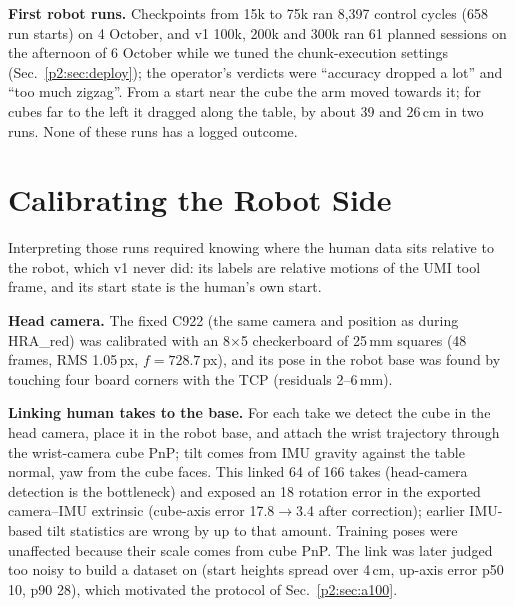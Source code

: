 \documentclass[conference,10pt]{IEEEtran}
\newcommand{\mm}{\,mm\xspace}
\begin{document}
\begin{table}[t]
\centering\footnotesize\setlength{\tabcolsep}{3pt}
\caption{Held-out loss (masked MSE on the 9 supervised dimensions) by checkpoint; training-subset loss in parentheses.}
\label{p2:tab:val}
\end{table}

\textbf{First robot runs.} Checkpoints from 15k to 75k ran 8{,}397 control cycles (658 run starts) on 4 October, and v1 100k,
200k and 300k ran 61 planned sessions on the afternoon of 6 October while we tuned the chunk-execution settings
(Sec.~\ref{p2:sec:deploy}); the operator's verdicts were ``accuracy dropped a lot'' and ``too much zigzag''. From a start near
the cube the arm moved towards it; for cubes far to the left it dragged along the table, by about 39 and 26\,cm in two runs.
None of these runs has a logged outcome.

\section{Calibrating the Robot Side}\label{p2:sec:robotcal}
Interpreting those runs required knowing where the human data sits relative to the robot, which v1 never did: its labels are
relative motions of the UMI tool frame, and its start state is the human's own start.

\textbf{Head camera.} The fixed C922 (the same camera and position as during HRA\_red) was calibrated with an 8$\times$5
checkerboard of 25\mm squares (48 frames, RMS 1.05\,px, $f=728.7$\,px), and its pose in the robot base was found by touching
four board corners with the TCP (residuals 2--6\mm).

\textbf{Linking human takes to the base.} For each take we detect the cube in the head camera, place it in the robot base, and
attach the wrist trajectory through the wrist-camera cube PnP; tilt comes from IMU gravity against the table normal, yaw from
the cube faces. This linked 64 of 166 takes (head-camera detection is the bottleneck) and exposed an 18\textdegree{} rotation
error in the exported camera--IMU extrinsic (cube-axis error 17.8$\to$3.4\textdegree{} after correction); earlier IMU-based
tilt statistics are wrong by up to that amount. Training poses were unaffected because their scale comes from cube PnP. The
link was later judged too noisy to build a dataset on (start heights spread over 4\,cm, up-axis error p50 10\textdegree,
p90 28\textdegree), which motivated the protocol of Sec.~\ref{p2:sec:a100}.
\end{document}
